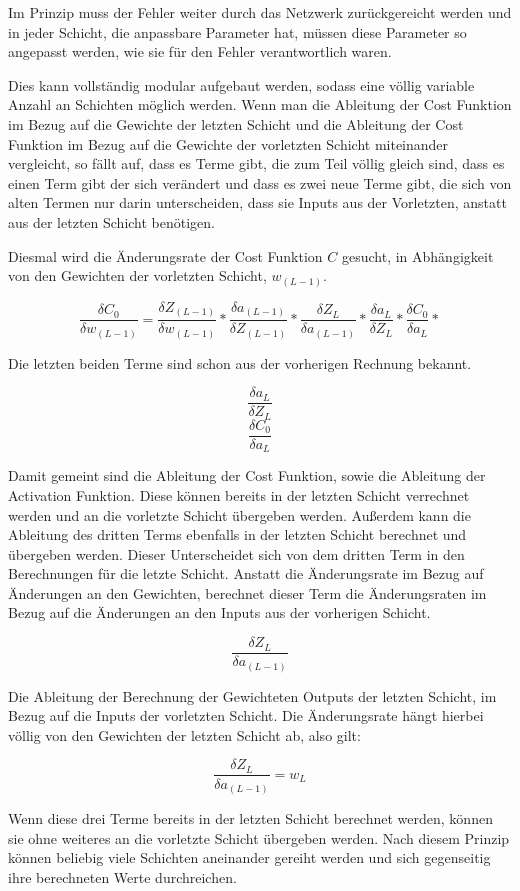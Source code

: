 \documentclass[12pt]{article}
\begin{document}
Im Prinzip muss der Fehler weiter durch das Netzwerk zurückgereicht werden und in jeder Schicht, die anpassbare Parameter hat, müssen diese Parameter so angepasst werden, wie sie für den Fehler verantwortlich waren.

Dies kann vollständig modular aufgebaut werden, sodass eine völlig variable Anzahl an Schichten möglich werden. Wenn man die Ableitung der Cost Funktion im Bezug auf die Gewichte der letzten Schicht und die Ableitung der Cost Funktion im Bezug auf die Gewichte der vorletzten Schicht miteinander vergleicht, so fällt auf, dass es Terme gibt, die zum Teil völlig gleich sind, dass es einen Term gibt der sich verändert und dass es zwei neue Terme gibt, die sich von alten Termen nur darin unterscheiden, dass sie Inputs aus der Vorletzten, anstatt aus der letzten Schicht benötigen.

Diesmal wird die Änderungsrate der Cost Funktion $C$ gesucht, in Abhängigkeit von den Gewichten der vorletzten Schicht, $w_{(L-1)}$.

$$\frac{\delta C_0}{\delta w_{(L-1)}}=
\frac{\delta Z_{(L-1)}}{\delta w_{(L-1)}}*
\frac{\delta a_{(L-1)}}{\delta Z_{(L-1)}}*
\frac{\delta Z_L}{\delta a_{(L-1)}}*
\frac{\delta a_L}{\delta Z_L}*
\frac{\delta C_0}{\delta a_L}*
$$

Die letzten beiden Terme sind schon aus der vorherigen Rechnung bekannt.

$$\frac{\delta a_L}{\delta Z_L}$$
$$\frac{\delta C_0}{\delta a_L}$$

Damit gemeint sind die Ableitung der Cost Funktion, sowie die Ableitung der Activation Funktion. Diese können bereits in der letzten Schicht verrechnet werden und an die vorletzte Schicht übergeben werden. Außerdem kann die Ableitung des dritten Terms ebenfalls in der letzten Schicht berechnet und übergeben werden. Dieser Unterscheidet sich von dem dritten Term in den Berechnungen für die letzte Schicht. Anstatt die Änderungsrate im Bezug auf Änderungen an den Gewichten, berechnet dieser Term die Änderungsraten im Bezug auf die Änderungen an den Inputs aus der vorherigen Schicht.

$$\frac{\delta Z_L}{\delta a_{(L-1)}}$$

Die Ableitung der Berechnung der Gewichteten Outputs der letzten Schicht, im Bezug auf die Inputs der vorletzten Schicht. Die Änderungsrate hängt hierbei völlig von den Gewichten der letzten Schicht ab, also gilt:

$$\frac{\delta Z_L}{\delta a_{(L-1)}} = w_L$$

Wenn diese drei Terme bereits in der letzten Schicht berechnet werden, können sie ohne weiteres an die vorletzte Schicht übergeben werden. Nach diesem Prinzip können beliebig viele Schichten aneinander gereiht werden und sich gegenseitig ihre berechneten Werte durchreichen. 
\end{document}
